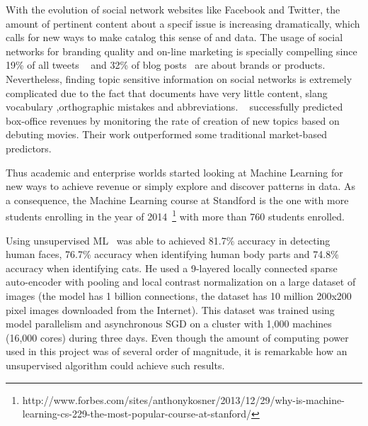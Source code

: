 With the evolution of social network websites like Facebook and Twitter, the amount of pertinent content about a specif issue is increasing dramatically, which calls for new ways to make catalog this sense of and data.
The usage of social networks for branding quality and on-line marketing is specially compelling since 19\% of all tweets ~\cite{Jansen2009} and 32\% of blog posts~\cite{Melville2009} are about brands or products. Nevertheless, finding topic sensitive information on social networks is extremely complicated due to the fact that documents have very little content, slang vocabulary ,orthographic mistakes and abbreviations. ~\citet{Asur2010} successfully predicted box-office revenues by monitoring the rate of creation of new topics based on debuting movies. Their work outperformed some traditional market-based predictors.

Thus academic and enterprise worlds started looking at Machine Learning for new ways to achieve revenue or simply explore and discover patterns in data. 
As a consequence, the Machine Learning course at Standford is the one with more students enrolling in the year of 2014~\footnote{http://www.forbes.com/sites/anthonykosner/2013/12/29/why-is-machine-learning-cs-229-the-most-popular-course-at-stanford/} with more than 760 students enrolled.

Using unsupervised \ac{ML}~\citet{Le2011} was able to achieved 81.7\% accuracy in detecting human faces, 76.7\% accuracy when identifying human body parts and 74.8\% accuracy when identifying cats. He used a 9-layered locally connected sparse auto-encoder with pooling and local contrast normalization on a large dataset of images (the model has 1 billion connections, the dataset has 10 million 200x200 pixel images downloaded from the Internet). This dataset was trained using model parallelism and asynchronous SGD on a cluster with 1,000 machines (16,000 cores) during three days. Even though the amount of computing power used in this project was of several order of magnitude, it is remarkable how an unsupervised algorithm could achieve such results.

